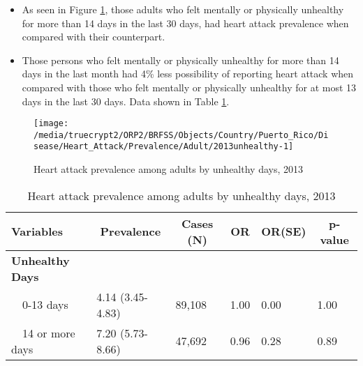 \newpage
\begin{itemize}

\item As seen in Figure \ref{fig:unhlthy.Heart_Attack.2013}, those adults who felt mentally or physically unhealthy for more than 14 days in the last 30 days, had  
heart attack prevalence when compared with their counterpart.


\item Those persons who felt mentally or physically unhealthy for more than 14 days in the last month had 4\% less possibility of reporting heart attack when compared with those who felt mentally or physically unhealthy for at most 13 days in the last 30 days. Data shown in Table \ref{tab:unhlthy.Heart_Attack.2013}.

\end{itemize}

\begin{figure}[H]
\caption{Heart attack prevalence among adults by unhealthy days, 2013}
\label{fig:unhlthy.Heart_Attack.2013}

\begin{knitrout}
\color{fgcolor}

{\centering \texttt{[image: /media/truecrypt2/ORP2/BRFSS/Objects/Country/Puerto\_Rico/Disease/Heart\_Attack/Prevalence/Adult/2013unhealthy-1]} 

}


\end{knitrout}
\end{figure}

\begin{table}[H]
\caption{Heart attack prevalence among adults by unhealthy days, 2013\label{tab:unhlthy.Heart_Attack.2013}} 
\begin{center}
\begin{tabular}{llllll}
\hline\hline
\multicolumn{1}{l}{Variables}&\multicolumn{1}{c}{Prevalence}&\multicolumn{1}{c}{Cases (N)}&\multicolumn{1}{c}{OR}&\multicolumn{1}{c}{OR(SE)}&\multicolumn{1}{c}{p-value}\tabularnewline
\hline
{\bfseries Unhealthy Days}&&&&&\tabularnewline
~~0-13 days&4.14 (3.45-4.83)&89,108&1.00&0.00&1.00\tabularnewline
~~14 or more days&7.20 (5.73-8.66)&47,692&0.96&0.28&0.89\tabularnewline
\hline
\end{tabular}\end{center}

\end{table}

